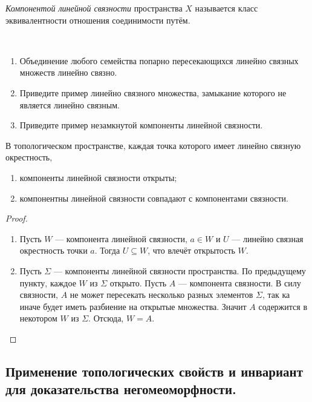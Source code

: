 \documentclass[12pt,a4paper]{article}
\begin{document}
    \begin{definition}
        \emph{Компонентой линейной связности} пространства $X$ называется класс эквивалентности отношения соединимости путём.
    \end{definition}

    \begin{exercise}\ 
        \begin{enumerate}
            \item Объединение любого семейства попарно пересекающихся линейно связных множеств линейно связно.
            \item Приведите пример линейно связного множества, замыкание которого не является линейно связным.
            \item Приведите пример незамкнутой компоненты линейной связности.
        \end{enumerate}
    \end{exercise}

    \begin{theorem}
        В топологическом пространстве, каждая точка которого имеет линейно связную окрестность,
        \begin{enumerate}
            \item компоненты линейной связности открыты;
            \item компонентны линейной связности совпадают с компонентами связности.
        \end{enumerate}
    \end{theorem}

    \begin{proof}
        \begin{enumerate}
            \item Пусть $W$ --- компонента линейной связности, $a \in W$ и $U$ --- линейно связная окрестность точки $a$. Тогда $U \subseteq W$, что влечёт открытость $W$.
            \item Пусть $\Sigma$ --- компоненты линейной связности пространства. По предыдущему пункту, каждое $W$ из $\Sigma$ открыто. Пусть $A$ --- компонента связности. В силу связности, $A$ не может пересекать несколько разных элементов $\Sigma$, так ка иначе будет иметь разбиение на открытые множества. Значит $A$ содержится в некотором $W$ из $\Sigma$. Отсюда, $W = A$.
        \end{enumerate}
    \end{proof}

    \subsection{Применение топологических свойств и инвариант для доказательства негомеоморфности.}
\end{document}
